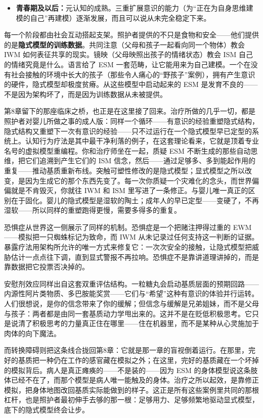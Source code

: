 \documentclass[11pt, twoside, openright]{book}
\begin{document}
\begin{itemize}
  \item \textbf{青春期及以后：}元认知的成熟。三重扩展意识的能力（为“正在为自身思维建模的自己”再建模）逐渐发展，而且可以说从未完全稳定下来。
\end{itemize}

每一个阶段都由社会互动搭起支架。照护者提供的不只是食物和安全------他们提供的是\textbf{隐式模型的训练数据}。共同注意（父母和孩子一起看向同一个物体）教会 IWM 如何表征共享的现实。镜映（父母映照出孩子的情绪状态）教会 ISM 自己的情绪究竟是什么。语言给了 ESM 一套范畴，让它能用来为自己建模。一个在没有社会接触的环境中长大的孩子（那些令人痛心的“野孩子”案例），拥有产生意识的硬件，隐式模型却极度贫瘠。从这些模型中启动起来的 ESM 是发育不良的------不是因为架构坏了，而是因为训练数据从未被提供。

第8章留下的那座临床之桥，也正是在这里接了回来。治疗所做的几乎一切，都是照护者对婴儿所做之事的成人版：同样一个循环------有意识的经验重塑隐式结构，隐式结构又重塑下一次有意识的经验------只不过运行在一个隐式模型早已定型的系统上。认知行为疗法是其中最干净利落的例子，在这套理论看来，它就是顶着专业名号的虚拟模型重编程。你和治疗师坐在一起，质疑 ESM 不断生成的那些自动思维，把它们追溯到产生它们的 ISM 信念，然后------通过足够多、多到能起作用的重复------推动基质重新布线。突触可塑性修改的是隐式模型；显式模型之所以改变，是因为生成它的那个东西先变了。每一次你质疑一个灾难化的念头，而世界偏偏就是不肯毁灭，你就往 IWM 和 ISM 里写进了一条修正。与婴儿唯一真正的区别在于固化。婴儿的隐式模型是湿软的陶土；成年人的早已定型------变硬了，不再湿软------所以同样的重塑跑得更慢，需要多得多的重复。

恐惧症从世界这一侧展示了同样的机制。恐惧症是一个把赌注押得过重的 EWM------模拟把一只蜘蛛标记为致命，而 IWM 从未记录过任何支持这一判断的证据。暴露疗法用架构所允许的唯一方式来修复它：一次次安全的接触，让隐式模型把威胁估计一点点往下调，直到显式警报不再拉响。恐惧症不是靠讲道理讲掉的，而是靠数据把它投票否决掉的。

安慰剂效应同样出自这套双重评估结构。一粒糖丸会启动基质层面的预期回路------内源性阿片类物质、多巴胺能奖赏------它们与“希望”这种有意识的体验并行运转。人们很想说，是你的信念带来了你的缓解；但信念与缓解是兄弟姐妹，而不是父母与孩子：两者都是由同一套基质动力学甩出来的。这并不是在贬低积极思考。它只是说清了积极思考的力量真正住在哪里------住在机器里，而不是某种从心灵施加于肉体的向下魔法。

而转换障碍则把这条线合拢回第8章：它就是那一章的盲视倒着运行。在那里，完好的基质把一种仍在工作的感官藏在模拟之外；在这里，完好的基质藏在一个坏掉的模拟背后。病人是真正瘫痪的------不是装的------因为 ESM 的身体模型说这条肢体已经不在了，而那个模型是病人唯一能触及的身体。治疗之所以起效，是靠修正模拟，把身体地图改回基质实际能做到的样子。这正是所有这些案例里共同的那根杠杆，也是照护者最初伸手去够的那一根：足够用力、足够频繁地驱动显式模型，底下的隐式模型终会让步。
\end{document}
